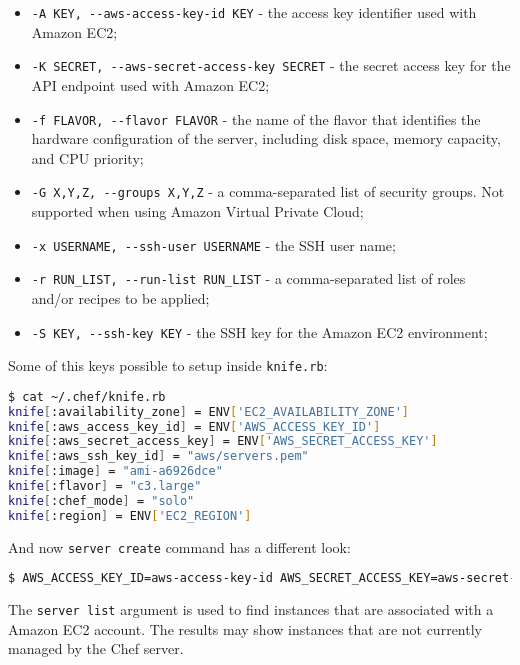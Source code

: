 \begin{itemize}
  \item \lstinline!-A KEY, --aws-access-key-id KEY! - the access key identifier used with Amazon EC2;
  \item \lstinline!-K SECRET, --aws-secret-access-key SECRET! - the secret access key for the API endpoint used with Amazon EC2;
  \item \lstinline!-f FLAVOR, --flavor FLAVOR! - the name of the flavor that identifies the hardware configuration of the server, including disk space, memory capacity, and CPU priority;
  \item \lstinline!-G X,Y,Z, --groups X,Y,Z! - a comma-separated list of security groups. Not supported when using Amazon Virtual Private Cloud;
  \item \lstinline!-x USERNAME, --ssh-user USERNAME! - the SSH user name;
  \item \lstinline!-r RUN_LIST, --run-list RUN_LIST! - a comma-separated list of roles and/or recipes to be applied;
  \item \lstinline!-S KEY, --ssh-key KEY! - the SSH key for the Amazon EC2 environment;
\end{itemize}

Some of this keys possible to setup inside \lstinline!knife.rb!:

\begin{lstlisting}[language=Bash,label=lst:knife-plugins3]
$ cat ~/.chef/knife.rb
knife[:availability_zone] = ENV['EC2_AVAILABILITY_ZONE']
knife[:aws_access_key_id] = ENV['AWS_ACCESS_KEY_ID']
knife[:aws_secret_access_key] = ENV['AWS_SECRET_ACCESS_KEY']
knife[:aws_ssh_key_id] = "aws/servers.pem"
knife[:image] = "ami-a6926dce"
knife[:flavor] = "c3.large"
knife[:chef_mode] = "solo"
knife[:region] = ENV['EC2_REGION']
\end{lstlisting}

And now \lstinline!server create! command has a different look:

\begin{lstlisting}[language=Bash,label=lst:knife-plugins4]
$ AWS_ACCESS_KEY_ID=aws-access-key-id AWS_SECRET_ACCESS_KEY=aws-secret-access-key knife ec2 server create -r "role[webserver]" -G www,default -x ubuntu -N server01
\end{lstlisting}

The \lstinline!server list! argument is used to find instances that are associated with a Amazon EC2 account. The results may show instances that are not currently managed by the Chef server.

